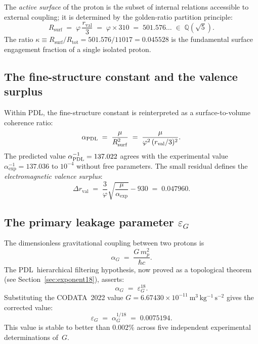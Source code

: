 \documentclass[11pt,a4paper]{article}
\theoremstyle{definition}
\newcommand{\PDL}{\textnormal{PDL}}
\newcommand{\Rsurf}{R_{\mathrm{surf}}}
\newcommand{\Rtot}{R_{\mathrm{tot}}}
\newcommand{\rval}{r_{\mathrm{val}}}
\newcommand{\epsg}{\varepsilon_G}
\newcommand{\vp}{\varphi}
\newcommand{\kap}{\kappa}
\begin{document}
The \emph{active surface} of the proton is the subset of internal relations accessible to external coupling; it is determined by the golden-ratio partition principle:\cite{Golden_Ratio_PDL_2026}
\begin{equation}
  \label{eq:Rsurf}
  \Rsurf \;=\; \vp\,\frac{\rval}{3} \;=\; \vp \times 310 \;=\; 501.576\ldots \;\in\; \mathbb{Q}(\sqrt{5}).
\end{equation}
The ratio $\kap \equiv \Rsurf/\Rtot = 501.576/11017 = 0.045528$ is the fundamental surface engagement fraction of a single isolated proton.

\subsection{The fine-structure constant and the valence surplus}
\label{subsec:alpha}

Within \PDL, the fine-structure constant is reinterpreted as a surface-to-volume coherence ratio:\cite{Alpha_PDL_v2_2026}
\begin{equation}
  \label{eq:alpha_PDL}
  \alpha_{\PDL} \;=\; \frac{\mu}{\Rsurf^2} \;=\; \frac{\mu}{\vp^2\,(\rval/3)^2}.
\end{equation}
The predicted value $\alpha_{\PDL}^{-1} = 137.022$ agrees with the experimental value $\alpha_{\exp}^{-1} = 137.036$ to $10^{-4}$ without free parameters. The small residual defines the \emph{electromagnetic valence surplus}:
\begin{equation}
  \label{eq:delta_r}
  \Delta\rval \;=\; \frac{3}{\vp}\sqrt{\frac{\mu}{\alpha_{\exp}}} - 930 \;=\; 0.047960.
\end{equation}

\subsection{The primary leakage parameter \texorpdfstring{$\epsg$}{epsg}}
\label{subsec:eps_G}

The dimensionless gravitational coupling between two protons is
\begin{equation}
  \label{eq:alpha_G}
  \alpha_G \;=\; \frac{G\,m_p^2}{\hbar c}.
\end{equation}
The \PDL\ hierarchical filtering hypothesis, now proved as a topological theorem (see Section~\ref{sec:exponent18}), asserts:
\begin{equation}
  \label{eq:filtering}
  \alpha_G \;=\; \epsg^{18}.
\end{equation}
Substituting the CODATA~2022 value $G = 6.67430\times 10^{-11}\ \mathrm{m^3\,kg^{-1}\,s^{-2}}$ gives the corrected value:\cite{Bridge_Formula_PDL_2026}
\begin{equation}
  \label{eq:eps_G_value}
  \epsg \;=\; \alpha_G^{1/18} \;=\; 0.0075194.
\end{equation}
This value is stable to better than $0.002\%$ across five independent experimental determinations of~$G$.
\end{document}

